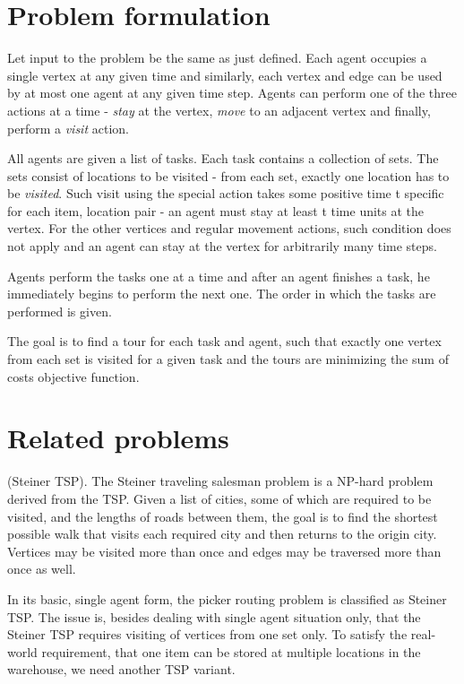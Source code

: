 \section{Problem formulation}
Let input to the problem be the same as just defined. Each agent occupies a single vertex at any given time and similarly, each vertex and edge can be used by at most one agent at any given time step. Agents can perform one of the three actions at a time - \emph{stay} at the vertex, \emph{move} to an adjacent vertex and finally, perform a \emph{visit} action.
\par

All agents are given a list of tasks. Each task contains a collection of sets. The sets consist of locations to be visited - from each set, exactly one location has to be \emph{visited}. Such visit using the special action takes some positive time t specific for each item, location pair - an agent must stay at least t time units at the vertex. For the other vertices and regular movement actions, such condition does not apply and an agent can stay at the vertex for arbitrarily many time steps.

Agents perform the tasks one at a time and after an agent finishes a task, he immediately begins to perform the next one. The order in which the tasks are performed is given.

The goal is to find a tour for each task and agent, such that exactly one vertex from each set is visited for a given task and the tours are minimizing the sum of costs objective function.

\section{Related problems}

\begin{definition} (Steiner TSP). 
The Steiner traveling salesman problem is a NP-hard problem derived from the TSP. Given a list of cities, some of which are required to be visited, and the lengths of roads between them, the goal is to find the shortest possible walk that visits each required city and then returns to the origin city. Vertices may be visited more than once and edges may be traversed more than once as well.
\end{definition}

In its basic, single agent form, the picker routing problem is classified as Steiner TSP. The issue is, besides dealing with single agent situation only, that the Steiner TSP requires visiting of vertices from one set only. To satisfy the real-world requirement, that one item can be stored at multiple locations in the warehouse, we need another TSP variant.

